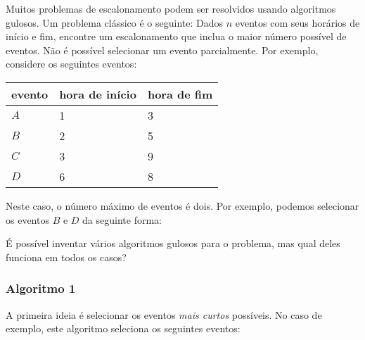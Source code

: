 Muitos problemas de escalonamento podem ser resolvidos
usando algoritmos gulosos.
Um problema clássico é o seguinte:
Dados $n$ eventos com seus horários de início e fim,
encontre um escalonamento
que inclua o maior número possível de eventos.
Não é possível selecionar um evento parcialmente.
Por exemplo, considere os seguintes eventos:
\begin{center}
\begin{tabular}{lll}
evento & hora de início & hora de fim \\
\hline
$A$ & 1 & 3 \\
$B$ & 2 & 5 \\
$C$ & 3 & 9 \\
$D$ & 6 & 8 \\
\end{tabular}
\end{center}
Neste caso, o número máximo de eventos é dois.
Por exemplo, podemos selecionar os eventos $B$ e $D$
da seguinte forma:
\begin{center}
\end{center}

É possível inventar vários algoritmos gulosos
para o problema, mas qual deles funciona em todos os casos?

\subsubsection*{Algoritmo 1}

A primeira ideia é selecionar os eventos
\emph{mais curtos} possíveis.
No caso de exemplo, este algoritmo
seleciona os seguintes eventos:
\begin{center}
\end{center}

